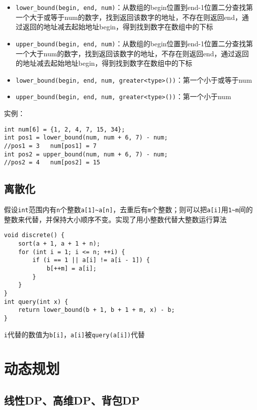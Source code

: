 \documentclass[UTF8]{ctexart}
\begin{document}
\begin{itemize}
	\item \texttt{lower\_bound(begin, end, num)}：从数组的begin位置到end-1位置二分查找第一个大于或等于num的数字，找到返回该数字的地址，不存在则返回end，通过返回的地址减去起始地址begin，得到找到数字在数组中的下标
	\item \texttt{upper\_bound(begin, end, num)}：从数组的begin位置到end-1位置二分查找第一个大于num的数字，找到返回该数字的地址，不存在则返回end，通过返回的地址减去起始地址begin，得到找到数字在数组中的下标
	\item \texttt{lower\_bound(begin, end, num, greater<type>())}：第一个小于或等于num
	\item \texttt{upper\_bound(begin, end, num, greater<type>())}：第一个小于num
\end{itemize}

实例：
\begin{lstlisting}
int num[6] = {1, 2, 4, 7, 15, 34}; 
int pos1 = lower_bound(num, num + 6, 7) - num;
//pos1 = 3   num[pos1] = 7
int pos2 = upper_bound(num, num + 6, 7) - num;
//pos2 = 4   num[pos2] = 15
\end{lstlisting}

\subsection{离散化}

假设\texttt{int}范围内有\texttt{n}个整数\texttt{a[1]\textasciitilde a[n]}，去重后有\texttt{m}个整数；则可以把\texttt{a[i]}用\texttt{1\textasciitilde m}间的整数来代替，并保持大小顺序不变。实现了用小整数代替大整数运行算法

\begin{lstlisting}
void discrete() {
    sort(a + 1, a + 1 + n);
    for (int i = 1; i <= n; ++i) {
        if (i == 1 || a[i] != a[i - 1]) {
            b[++m] = a[i];
        }
    }
}
int query(int x) {
    return lower_bound(b + 1, b + 1 + m, x) - b;
}
\end{lstlisting}

\texttt{i}代替的数值为\texttt{b[i]}，\texttt{a[i]}被\texttt{query(a[i])}代替

\section{动态规划}
\subsection{线性DP、高维DP、背包DP}
\end{document}
